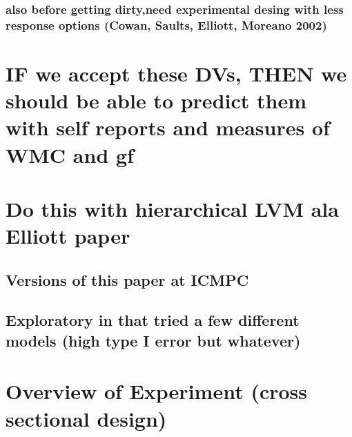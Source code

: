 \documentclass[]{book}
\theoremstyle{definition}
\theoremstyle{definition}
\theoremstyle{definition}
\theoremstyle{remark}
\begin{document}
\hypertarget{also-before-getting-dirtyneed-experimental-desing-with-less-response-options-cowan-saults-elliott-moreano-2002}{%
\subsubsection{also before getting dirty,need experimental desing with
less response options (Cowan, Saults, Elliott, Moreano
2002)}\label{also-before-getting-dirtyneed-experimental-desing-with-less-response-options-cowan-saults-elliott-moreano-2002}}

\hypertarget{if-we-accept-these-dvs-then-we-should-be-able-to-predict-them-with-self-reports-and-measures-of-wmc-and-gf}{%
\section{IF we accept these DVs, THEN we should be able to predict them
with self reports and measures of WMC and
gf}\label{if-we-accept-these-dvs-then-we-should-be-able-to-predict-them-with-self-reports-and-measures-of-wmc-and-gf}}

\hypertarget{do-this-with-hierarchical-lvm-ala-elliott-paper}{%
\section{Do this with hierarchical LVM ala Elliott
paper}\label{do-this-with-hierarchical-lvm-ala-elliott-paper}}

\hypertarget{versions-of-this-paper-at-icmpc}{%
\subsection{Versions of this paper at
ICMPC}\label{versions-of-this-paper-at-icmpc}}

\hypertarget{exploratory-in-that-tried-a-few-different-models-high-type-i-error-but-whatever}{%
\subsection{Exploratory in that tried a few different models (high type
I error but
whatever)}\label{exploratory-in-that-tried-a-few-different-models-high-type-i-error-but-whatever}}

\hypertarget{overview-of-experiment-cross-sectional-design}{%
\section{Overview of Experiment (cross sectional
design)}\label{overview-of-experiment-cross-sectional-design}}
\end{document}

